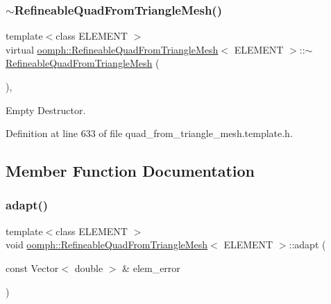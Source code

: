 \subsubsection{\texorpdfstring{$\sim$\+Refineable\+Quad\+From\+Triangle\+Mesh()}{~RefineableQuadFromTriangleMesh()}}
{\footnotesize\ttfamily template$<$class E\+L\+E\+M\+E\+NT $>$ \\
virtual \hyperlink{classoomph_1_1RefineableQuadFromTriangleMesh}{oomph\+::\+Refineable\+Quad\+From\+Triangle\+Mesh}$<$ E\+L\+E\+M\+E\+NT $>$\+::$\sim$\hyperlink{classoomph_1_1RefineableQuadFromTriangleMesh}{Refineable\+Quad\+From\+Triangle\+Mesh} (\begin{DoxyParamCaption}{ }\end{DoxyParamCaption})\hspace{0.3cm}{\ttfamily [inline]}, {\ttfamily [virtual]}}



Empty Destructor. 



Definition at line 633 of file quad\+\_\+from\+\_\+triangle\+\_\+mesh.\+template.\+h.



\subsection{Member Function Documentation}
\mbox{\label{classoomph_1_1RefineableQuadFromTriangleMesh_a7d2efa292dd5dd4930e661fd32e42eec}} 
\subsubsection{\texorpdfstring{adapt()}{adapt()}}
{\footnotesize\ttfamily template$<$class E\+L\+E\+M\+E\+NT $>$ \\
void \hyperlink{classoomph_1_1RefineableQuadFromTriangleMesh}{oomph\+::\+Refineable\+Quad\+From\+Triangle\+Mesh}$<$ E\+L\+E\+M\+E\+NT $>$\+::adapt (\begin{DoxyParamCaption}\item[{const Vector$<$ double $>$ \&}]{elem\+\_\+error }\end{DoxyParamCaption})}




